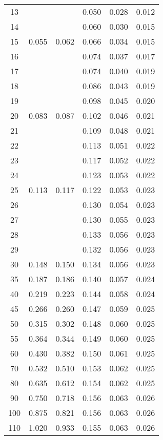 \begin{table}
\begin{tabular}{c||c|c|c|c|c}
      13	&       &       & 0.050	& 0.028	& 0.012 \\
      14	&       &       & 0.060	& 0.030	& 0.015 \\
      15	& 0.055 & 0.062 & 0.066	& 0.034	& 0.015 \\
      16	&       &       & 0.074	& 0.037	& 0.017 \\
      17	&       &       & 0.074	& 0.040	& 0.019 \\
      18	&       &       & 0.086	& 0.043	& 0.019 \\
      19	&       &       & 0.098	& 0.045	& 0.020 \\
      20	& 0.083 & 0.087 & 0.102	& 0.046	& 0.021 \\
      21	&       &       & 0.109	& 0.048	& 0.021 \\
      22	&       &       & 0.113	& 0.051	& 0.022 \\
      23	&       &       & 0.117	& 0.052	& 0.022 \\
      24	&       &       & 0.123	& 0.053	& 0.022 \\
      25	& 0.113 & 0.117 & 0.122	& 0.053	& 0.023 \\
      26	&       &       & 0.130	& 0.054	& 0.023 \\
      27	&       &       & 0.130	& 0.055	& 0.023 \\
      28	&       &       & 0.133	& 0.056	& 0.023 \\
      29	&       &       & 0.132	& 0.056	& 0.023 \\
      30	& 0.148 & 0.150 & 0.134	& 0.056	& 0.023 \\
      35	& 0.187 & 0.186 & 0.140	& 0.057	& 0.024 \\
      40	& 0.219 & 0.223 & 0.144	& 0.058	& 0.024 \\
      45	& 0.266 & 0.260 & 0.147	& 0.059	& 0.025 \\
      50	& 0.315 & 0.302 & 0.148	& 0.060	& 0.025 \\
      55	& 0.364 & 0.344 & 0.149	& 0.060	& 0.025 \\
      60	& 0.430 & 0.382 & 0.150	& 0.061	& 0.025 \\
      70	& 0.532 & 0.510 & 0.153	& 0.062	& 0.025 \\
      80	& 0.635 & 0.612 & 0.154	& 0.062	& 0.025 \\
      90	& 0.750 & 0.718 & 0.156	& 0.063	& 0.026 \\
      100	& 0.875 & 0.821 & 0.156	& 0.063	& 0.026 \\
      110	& 1.020 & 0.933 & 0.155	& 0.063	& 0.026 \\

\end{tabular}
\end{table}
